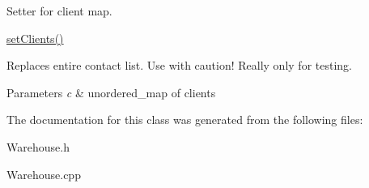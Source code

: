 Setter for client map. 

\hyperlink{classWarehouse_ae34b31372ac5b88ddfbb841792203942}{set\+Clients()}

Replaces entire contact list. Use with caution! Really only for testing. 
\begin{DoxyParams}{Parameters}
{\em c} & unordered\+\_\+map of clients \\
\hline
\end{DoxyParams}


The documentation for this class was generated from the following files\+:\begin{DoxyCompactItemize}
\item 
Warehouse.\+h\item 
Warehouse.\+cpp\end{DoxyCompactItemize}
